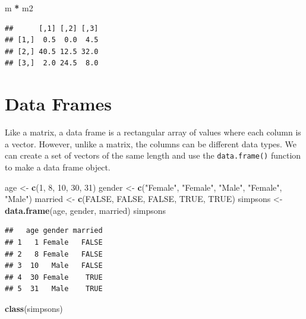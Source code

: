 \documentclass[
]{book}
\newenvironment{Shaded}{\begin{snugshade}}{\end{snugshade}}
\newcommand{\DecValTok}[1]{\textcolor[rgb]{0.00,0.00,0.81}{#1}}
\newcommand{\KeywordTok}[1]{\textcolor[rgb]{0.13,0.29,0.53}{\textbf{#1}}}
\newcommand{\NormalTok}[1]{#1}
\newcommand{\OperatorTok}[1]{\textcolor[rgb]{0.81,0.36,0.00}{\textbf{#1}}}
\newcommand{\OtherTok}[1]{\textcolor[rgb]{0.56,0.35,0.01}{#1}}
\newcommand{\StringTok}[1]{\textcolor[rgb]{0.31,0.60,0.02}{#1}}
\begin{document}
\begin{Shaded}
\begin{Highlighting}[]
\NormalTok{m }\OperatorTok{*}\StringTok{ }\NormalTok{m2}
\end{Highlighting}
\end{Shaded}

\begin{verbatim}
##      [,1] [,2] [,3]
## [1,]  0.5  0.0  4.5
## [2,] 40.5 12.5 32.0
## [3,]  2.0 24.5  8.0
\end{verbatim}

\hypertarget{data-frames}{%
\section{Data Frames}\label{data-frames}}

Like a matrix, a data frame is a rectangular array of values where each column is a vector. However, unlike a matrix, the columns can be different data types. We can create a set of vectors of the same length and use the \texttt{data.frame()} function to make a data frame object.

\begin{Shaded}
\begin{Highlighting}[]
\NormalTok{age <-}\StringTok{ }\KeywordTok{c}\NormalTok{(}\DecValTok{1}\NormalTok{, }\DecValTok{8}\NormalTok{, }\DecValTok{10}\NormalTok{, }\DecValTok{30}\NormalTok{, }\DecValTok{31}\NormalTok{)}
\NormalTok{gender <-}\StringTok{ }\KeywordTok{c}\NormalTok{(}\StringTok{"Female"}\NormalTok{, }\StringTok{"Female"}\NormalTok{, }\StringTok{"Male"}\NormalTok{, }\StringTok{"Female"}\NormalTok{, }\StringTok{"Male"}\NormalTok{)}
\NormalTok{married <-}\StringTok{ }\KeywordTok{c}\NormalTok{(}\OtherTok{FALSE}\NormalTok{, }\OtherTok{FALSE}\NormalTok{, }\OtherTok{FALSE}\NormalTok{, }\OtherTok{TRUE}\NormalTok{, }\OtherTok{TRUE}\NormalTok{)}
\NormalTok{simpsons <-}\StringTok{ }\KeywordTok{data.frame}\NormalTok{(age, gender, married)}
\NormalTok{simpsons}
\end{Highlighting}
\end{Shaded}

\begin{verbatim}
##   age gender married
## 1   1 Female   FALSE
## 2   8 Female   FALSE
## 3  10   Male   FALSE
## 4  30 Female    TRUE
## 5  31   Male    TRUE
\end{verbatim}

\begin{Shaded}
\begin{Highlighting}[]
\KeywordTok{class}\NormalTok{(simpsons)}
\end{Highlighting}
\end{Shaded}
\end{document}
